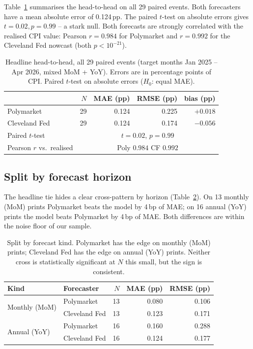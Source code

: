 \documentclass{article}
\begin{document}
Table~\ref{tab:headline} summarises the head-to-head on all 29 paired
events.  Both forecasters have a mean absolute error of
0.124\,pp.  The paired $t$-test on absolute errors gives
$t = 0.02, p = 0.99$ -- a stark null.  Both forecasts are strongly
correlated with the realised CPI value: Pearson $r = 0.984$ for
Polymarket and $r = 0.992$ for the Cleveland Fed nowcast (both
$p < 10^{-21}$).

\begin{table}[t]
\centering
\caption{Headline head-to-head, all 29 paired events
(target months Jan 2025 -- Apr 2026, mixed MoM + YoY).  Errors are
in percentage points of CPI.  Paired $t$-test on absolute errors
($H_0$: equal MAE).}
\label{tab:headline}
\begin{tabular}{lrrrr}
\toprule
                   & $N$ & MAE (pp) & RMSE (pp) & bias (pp) \\
\midrule
Polymarket         & 29 & 0.124 & 0.225 & $+0.018$ \\
Cleveland Fed      & 29 & 0.124 & 0.174 & $-0.056$ \\
\midrule
Paired $t$-test    & \multicolumn{4}{c}{$t = 0.02$, $p = 0.99$} \\
Pearson $r$ vs.\ realised & \multicolumn{4}{c}{Poly $0.984$ \quad CF $0.992$} \\
\bottomrule
\end{tabular}
\end{table}

\subsection{Split by forecast horizon}

The headline tie hides a clear cross-pattern by horizon
(Table~\ref{tab:by_kind}).  On 13 monthly (MoM) prints Polymarket
beats the model by 4\,bp of MAE; on 16 annual (YoY) prints the model
beats Polymarket by 4\,bp of MAE.  Both differences are within the
noise floor of our sample.

\begin{table}[t]
\centering
\caption{Split by forecast kind.  Polymarket has the edge on monthly
(MoM) prints; Cleveland Fed has the edge on annual (YoY) prints.
Neither cross is statistically significant at $N$ this small, but the
sign is consistent.}
\label{tab:by_kind}
\begin{tabular}{llrrr}
\toprule
Kind & Forecaster & $N$ & MAE (pp) & RMSE (pp) \\
\midrule
\multirow{2}{*}{Monthly (MoM)} & Polymarket    & 13 & 0.080 & 0.106 \\
                               & Cleveland Fed & 13 & 0.123 & 0.171 \\
\midrule
\multirow{2}{*}{Annual (YoY)}  & Polymarket    & 16 & 0.160 & 0.288 \\
                               & Cleveland Fed & 16 & 0.124 & 0.177 \\
\bottomrule
\end{tabular}
\end{table}
\end{document}
